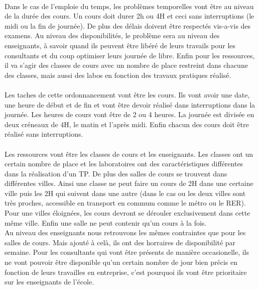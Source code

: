 \documentclass[12pt]{article}
\begin{document}
		\paragraph{}
			Dans le cas de l'emploie du temps, les problèmes temporelles vont être au niveau de la durée des cours. Un cours doit durer 2h ou 4H et ceci sans interruptions (le midi ou la fin de journée). De plus des délais doivent être respectés vis-a-vis des examens. Au niveau des disponibilités, le problème sera au niveau des enseignants, à savoir quand ils peuvent être libéré de leurs travails pour les consultants et du coup optimiser leurs journée de libre. Enfin pour les ressources, il va s'agir des classes de cours avec un nombre de place restreint dans chacune des classes, mais aussi des labos en fonction des travaux pratiques réalisé.

		\paragraph{}
			Les taches de cette ordonnancement vont être les cours. Ils vont avoir une date, une heure de début et de fin et vont être devoir réalisé dans interruptions dans la journée. Les heures de cours vont être de 2 ou 4 heures. La journée est divisée en deux créneaux de 4H, le matin et l'après midi. Enfin chacun des cours doit être réalisé sans interruptions.

		\paragraph{}
			Les ressources vont être les classes de cours et les enseignants. Les classes ont un certain nombre de place et les laboratoires ont des caractéristiques différentes dans la réalisation d'un TP. De plus des salles de cours se trouvent dans différentes villes. Ainsi une classe ne peut faire un cours de 2H dans une certaine ville puis les 2H qui suivent dans une autre (dans le cas ou les deux villes sont très proches, accessible en transport en commum comme le métro ou le RER). Pour une villes éloignées, les cours devront se dérouler exclusivement dans cette même ville. Enfin une salle ne peut contenir qu'un cours à la fois.\\
Au niveau des enseignants nous retrouvons les mêmes contraintes que pour les salles de cours. Mais ajouté à celà, ils ont des horraires de disponibilité par semaine. Pour les consultants qui vont être présents de manière occasionelle, ils ne vont pouvoir être disponible qu'un certain nombre de jour bien précis en fonction de leurs travailles en entreprise, c'est pourquoi ils vont être prioritaire sur les enseignants de l'école.
\end{document}
